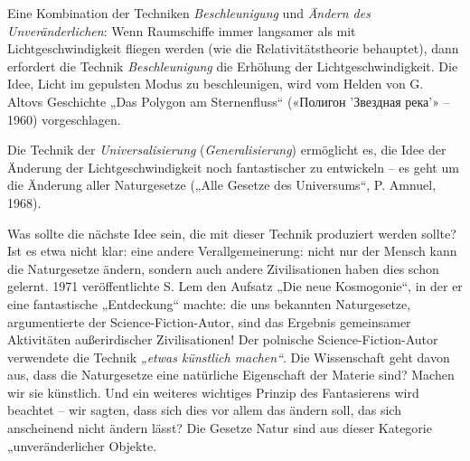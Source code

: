 \documentclass[11pt,a4paper]{article}
\begin{document}
Eine Kombination der Techniken \emph{Beschleunigung} und \emph{Ändern des
  Unveränderlichen}: Wenn Raumschiffe immer langsamer als mit
Lichtgeschwindigkeit fliegen werden (wie die Relativitätstheorie behauptet),
dann erfordert die Technik \emph{Beschleunigung} die Erhöhung der
Lichtgeschwindigkeit.  Die Idee, Licht im gepulsten Modus zu beschleunigen,
wird vom Helden von G. Altovs Geschichte „Das Polygon am Sternenfluss“
(\foreignlanguage{russian}{«Полигон 'Звездная река'»} -- 1960) vorgeschlagen.

Die Technik der \emph{Universalisierung} (\emph{Generalisierung}) ermöglicht
es, die Idee der Änderung der Lichtgeschwindigkeit noch fantastischer zu
entwickeln -- es geht um die Änderung aller Naturgesetze („Alle Gesetze des
Universums“, P. Amnuel, 1968).

Was sollte die nächste Idee sein, die mit dieser Technik produziert werden
sollte? Ist es etwa nicht klar: eine andere Verallgemeinerung: nicht nur der
Mensch kann die Naturgesetze ändern, sondern auch andere Zivilisationen haben
dies schon gelernt. 1971 veröffentlichte S. Lem den Aufsatz „Die neue
Kosmogonie“, in der er eine fantastische „Entdeckung“ machte: die uns
bekannten Naturgesetze, argumentierte der Science-Fiction-Autor, sind das
Ergebnis gemeinsamer Aktivitäten außerirdischer Zivilisationen! Der polnische
Science-Fiction-Autor verwendete die Technik \emph{„etwas künstlich machen“}.
Die Wissenschaft geht davon aus, dass die Naturgesetze eine natürliche
Eigenschaft der Materie sind? Machen wir sie künstlich. Und ein weiteres
wichtiges Prinzip des Fantasierens wird beachtet -- wir sagten, dass sich dies
vor allem das ändern soll, das sich anscheinend nicht ändern lässt?  Die
Gesetze Natur sind aus dieser Kategorie „unveränderlicher Objekte.  
\end{document}

